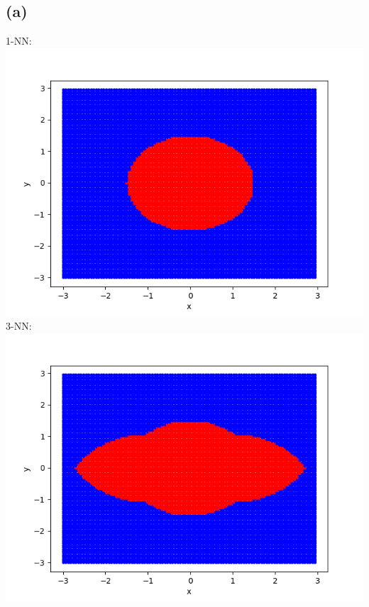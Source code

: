 \documentclass{article}
\begin{document}
	\subsection*{(a)}
		1-NN:\\
		\includegraphics[scale=0.8]{p6.1b1}\\
		3-NN:\\
		\includegraphics[scale=0.8]{p6.1b3}
		
\end{document}
